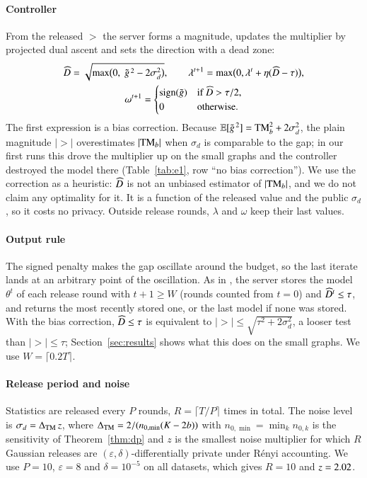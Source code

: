 \paragraph{Controller}
From the released $\gt$ the server forms a magnitude, updates the multiplier by projected dual ascent and sets the direction with a dead zone:
\begin{equation}\label{eq:ctrl}
\begin{gathered}
\widehat{D}=\sqrt{\max\bigl(0,\;\tilde g^{\,2}-2\sigma_d^2\bigr)},\qquad \lambda^{t+1}=\max\bigl(0,\lambda^t+\eta(\widehat{D}-\tau)\bigr),\\
\omega^{t+1}=\begin{cases}\mathrm{sign}(\tilde g)&\text{if }\widehat{D}>\tau/2,\\0&\text{otherwise.}\end{cases}
\end{gathered}
\end{equation}
The first expression is a bias correction. Because $\mathbb{E}[\tilde g^{\,2}]=\mathrm{TM}_b^2+2\sigma_d^2$, the plain magnitude $|\gt|$ overestimates $|\mathrm{TM}_b|$ when $\sigma_d$ is comparable to the gap; in our first runs this drove the multiplier up on the small graphs and the controller destroyed the model there (Table~\ref{tab:e1}, row ``no bias correction''). We use the correction as a heuristic: $\widehat{D}$ is not an unbiased estimator of $|\mathrm{TM}_b|$, and we do not claim any optimality for it. It is a function of the released value and the public $\sigma_d$, so it costs no privacy. Outside release rounds, $\lambda$ and $\omega$ keep their last values.

\paragraph{Output rule}
The signed penalty makes the gap oscillate around the budget, so the last iterate lands at an arbitrary point of the oscillation. As in \clamp{}, the server stores the model $\theta^t$ of each release round with $t+1\ge W$ (rounds counted from $t=0$) and $\widehat{D}^t\le\tau$, and returns the most recently stored one, or the last model if none was stored. With the bias correction, $\widehat{D}\le\tau$ is equivalent to $|\gt|\le\sqrt{\tau^2+2\sigma_d^2}$, a looser test than $|\gt|\le\tau$; Section~\ref{sec:results} shows what this does on the small graphs. We use $W=\lceil0.2T\rceil$.

\paragraph{Release period and noise}
Statistics are released every $P$ rounds, $R=\lceil T/P\rceil$ times in total. The noise level is $\sigma_d=\Delta_{\mathrm{TM}}\,z$, where $\Delta_{\mathrm{TM}}=2/(n_{0,\min}(K-2b))$ with $n_{0,\min}=\min_k n_{0,k}$ is the sensitivity of Theorem~\ref{thm:dp} and $z$ is the smallest noise multiplier for which $R$ Gaussian releases are $(\varepsilon,\delta)$-differentially private under R\'enyi accounting. We use $P=10$, $\varepsilon=8$ and $\delta=10^{-5}$ on all datasets, which gives $R=10$ and $z=2.02$.

